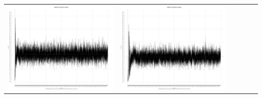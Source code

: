 \begin{table}[htbp]
{\begin{tabular}{l | ccccc}
\begin{minipage}{.15\textwidth}
     			 	\includegraphics[width=\linewidth]{images/mema-triple/N12}
    				 \end{minipage}
    			   &	 \begin{minipage}{.15\textwidth}
     			 	\includegraphics[width=\linewidth]{images/mema-triple/N14}
    				 \end{minipage}
    			   &	 \begin{minipage}{.15\textwidth}

\end{minipage}
\end{tabular}}
\end{table}
